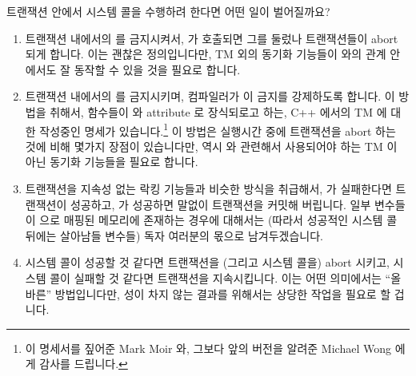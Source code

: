 트랜잭션 안에서  시스템 콜을 수행하려 한다면 어떤 일이 벌어질까요?

\begin{enumerate}
\item	트랜잭션 내에서의  를 금지시켜서,  가 호출되면
	그를 둘렀나 트랜잭션들이 abort 되게 합니다.
	이는 괜찮은 정의입니다만, TM 외의 동기화 기능들이  와의 관계
	안에서도 잘 동작할 수 있을 것을 필요로 합니다.
\item	트랜잭션 내에서의  를 금지시키며, 컴파일러가 이 금지를
	강제하도록 합니다.
	이 방법을 취해서, 함수들이  와
	 attribute 로 장식되로고 하는, C++ 에서의 TM 에
	대한 작성중인 명세가 있습니다.\footnote{
		이 명세서를 짚어준 Mark Moir 와, 그보다 앞의 버전을 알려준
		Michael Wong 에게 감사를  드립니다.}
	이 방법은 실행시간 중에 트랜잭션을 abort 하는 것에 비해 몇가지 장점이
	있습니다만, 역시  와 관련해서 사용되어야 하는 TM 이 아닌
	동기화 기능들을 필요로 합니다.

\item	트랜잭션을 지속성 없는 락킹 기능들과 비슷한 방식을 취급해서,
	 가 실패한다면 트랜잭션이 성공하고,  가 성공하면
	말없이 트랜잭션을 커밋해 버립니다.
	일부 변수들이  으로 매핑된 메모리에 존재하는 경우에 대해서는
	(따라서 성공적인  시스템 콜 뒤에는 살아남들 변수들) 독자
	여러분의 몫으로 남겨두겠습니다.
\item	{} 시스템 콜이 성공할 것 같다면 트랜잭션을 (그리고 
	시스템 콜을) abort 시키고,  시스템 콜이 실패할 것 같다면
	트랜잭션을 지속시킵니다.
	이는 어떤 의미에서는 ``올바른'' 방법입니다만, 성이 차지 않는 결과를
	위해서는 상당한 작업을 필요로 할 겁니다.
\iffalse


\end{enumerate}
